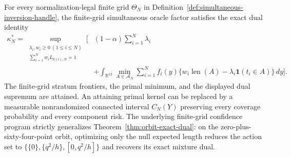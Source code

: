 For every normalization-legal finite grid \(\Theta_N\) in Definition~\ref{def:simultaneous-inversion-handle}, the finite-grid simultaneous oracle factor satisfies the exact dual identity
\[
\begin{split}
 \kappa_N^*=\sup_{\substack{\lambda_i,w_i\geq0\ (1\leq i\leq N)\\
                 \sum_{i=1}^Nw_iL_{k(i),N}=1}}
 \bigg[&(1-\alpha)\sum_{i=1}^N\lambda_i\\
 &+\int_{\mathbb R^{12}}\min_{A\in\mathcal A_N}
 \sum_{i=1}^Nf_i(y)
 \{w_i\operatorname{len}(A)-\lambda_i\mathbf 1(t_i\in A)\}\,dy\bigg].
\end{split}
\]
The finite-grid stratum frontiers, the primal minimum, and the displayed dual supremum are attained.  An attaining primal kernel can be replaced by a measurable nonrandomized connected interval \(C_N(Y)\) preserving every coverage probability and every component risk.  The underlying finite-grid confidence program strictly generalizes Theorem~\ref{thm:orbit-exact-dual}: on the zero-plus-sixty-four-point orbit, optimizing only the null expected length reduces the action set to \(\{\{0\},\{q^2/h\},[0,q^2/h]\}\) and recovers its exact mixture dual.